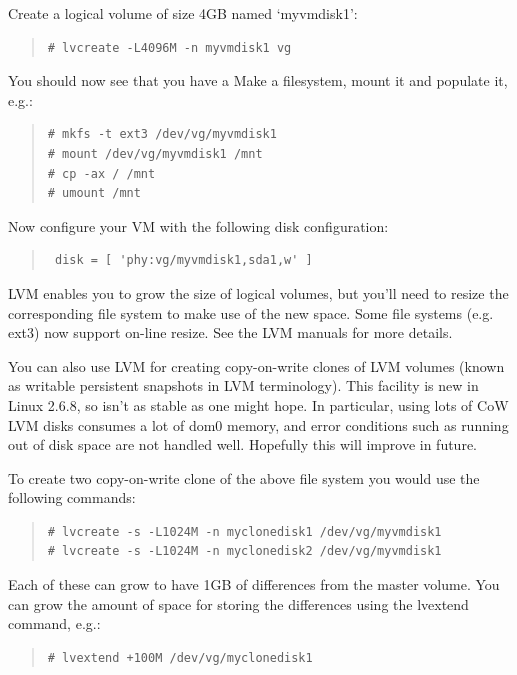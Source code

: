 \documentclass[11pt,twoside,final,openright]{report}
\begin{document}
Create a logical volume of size 4GB named `myvmdisk1':
\begin{quote}
\begin{verbatim} 
# lvcreate -L4096M -n myvmdisk1 vg
\end{verbatim} 
\end{quote}

You should now see that you have a 
Make a filesystem, mount it and populate it, e.g.:
\begin{quote}
\begin{verbatim} 
# mkfs -t ext3 /dev/vg/myvmdisk1
# mount /dev/vg/myvmdisk1 /mnt
# cp -ax / /mnt
# umount /mnt
\end{verbatim} 
\end{quote}

Now configure your VM with the following disk configuration:
\begin{quote}
\begin{verbatim} 
 disk = [ 'phy:vg/myvmdisk1,sda1,w' ]
\end{verbatim} 
\end{quote}

LVM enables you to grow the size of logical volumes, but you'll need
to resize the corresponding file system to make use of the new
space. Some file systems (e.g. ext3) now support on-line resize.  See
the LVM manuals for more details.

You can also use LVM for creating copy-on-write clones of LVM
volumes (known as writable persistent snapshots in LVM
terminology). This facility is new in Linux 2.6.8, so isn't as
stable as one might hope. In particular, using lots of CoW LVM
disks consumes a lot of dom0 memory, and error conditions such as
running out of disk space are not handled well. Hopefully this
will improve in future.

To create two copy-on-write clone of the above file system you
would use the following commands:

\begin{quote}
\begin{verbatim} 
# lvcreate -s -L1024M -n myclonedisk1 /dev/vg/myvmdisk1
# lvcreate -s -L1024M -n myclonedisk2 /dev/vg/myvmdisk1
\end{verbatim} 
\end{quote}

Each of these can grow to have 1GB of differences from the master
volume. You can grow the amount of space for storing the
differences using the lvextend command, e.g.:
\begin{quote}
\begin{verbatim} 
# lvextend +100M /dev/vg/myclonedisk1
\end{verbatim} 
\end{quote}
\end{document}
